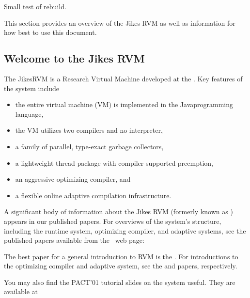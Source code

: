 Small test of rebuild.

This section provides an overview of the Jikes RVM as well as
information for how best to use this document.

\subsection{Welcome to the Jikes RVM}

The Jikes\JikesTMFootnote RVM is a Research Virtual Machine 
 developed at the 
.  Key
features of the system include
\begin{itemize}
\item the entire virtual machine (VM) is implemented in the
  Java\JavaTMFootnote  programming language,
\item the VM utilizes two compilers and no interpreter,
\item a family of parallel, type-exact garbage collectors,
\item a lightweight thread package with compiler-supported preemption,
\item an aggressive optimizing compiler, and 
\item a flexible online adaptive compilation infrastructure.
\end{itemize}

A significant body of information about the Jikes RVM 
(formerly known as 
\xlink{\jp}{\JalapenoHomeURL}) appears 
in our published
papers.  For overviews of the system's structure, including the runtime system,
optimizing compiler, and adaptive systems, see the published papers
available from the \jrvm\ web page:
\begin{quote}
\xlink{{\RVMPubsURL}}{\RVMPubsURL}
\end{quote}

The best paper for a general introduction to RVM is 
the 
.  
For introductions to the
optimizing compiler and adaptive system, see the 
{\JavaGrandePaperURL}
 and 
{\OOPSLAPaperURL}  
papers, respectively.

You may also find the PACT'01 tutorial slides on the system useful.
They are available at
\begin{quote}
\xlink{{\RVMSlidesURL}}{\RVMSlidesURL}
\end{quote}

